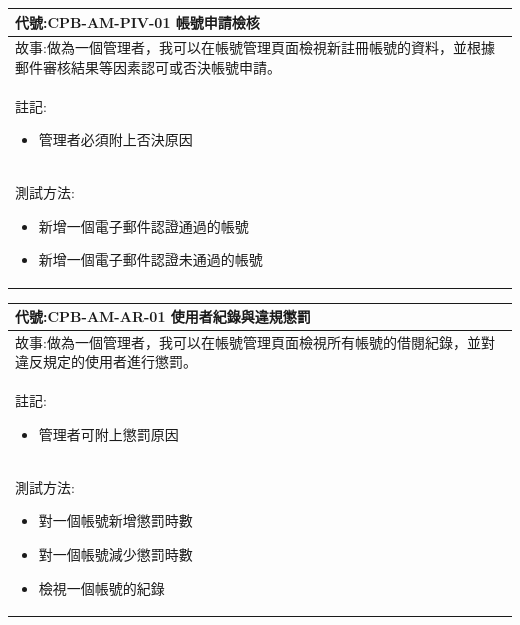 \documentclass{article}
\begin{document}
\begin{table}[H]
	\begin{tabular}{| m{13cm} |}
		\hline
		代號:CPB-AM-PIV-01	帳號申請檢核                                \\ \hline
		故事:做為一個管理者，我可以在帳號管理頁面檢視新註冊帳號的資料，並根據郵件審核結果等因素認可或否決帳號申請。 \\	\hline
		註記:
		\begin{itemize}
			\item 管理者必須附上否決原因
		\end{itemize}                                       \\ \hline
		測試方法:
		\begin{itemize}
			\item 新增一個電子郵件認證通過的帳號
			\item 新增一個電子郵件認證未通過的帳號
		\end{itemize}
		\\	\hline
	\end{tabular}
\end{table}

\begin{table}[H]
	\begin{tabular}{| m{13cm} |}
		\hline
		代號:CPB-AM-AR-01	使用者紀錄與違規懲罰                       \\ \hline
		故事:做為一個管理者，我可以在帳號管理頁面檢視所有帳號的借閱紀錄，並對違反規定的使用者進行懲罰。 \\	\hline
		註記:
		\begin{itemize}
			\item 管理者可附上懲罰原因
		\end{itemize}                                  \\ \hline
		測試方法:
		\begin{itemize}
			\item 對一個帳號新增懲罰時數
			\item 對一個帳號減少懲罰時數
			\item 檢視一個帳號的紀錄
		\end{itemize}
		\\	\hline
	\end{tabular}
\end{table}
\end{document}
